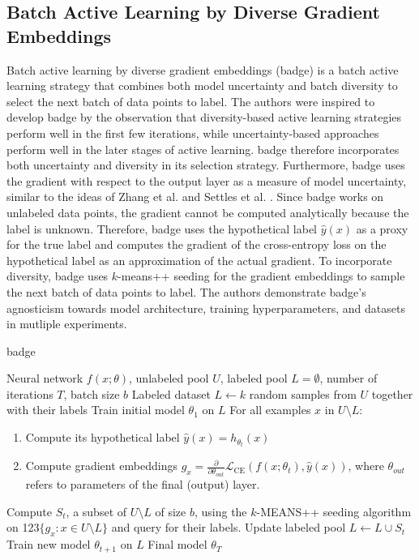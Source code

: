 \subsection{Batch Active Learning by Diverse Gradient Embeddings}
\label{sec:Related_work:Active_Learning:BADGE}
Batch active learning by diverse gradient embeddings (\gls{badge}) \cite{ash2019deep} is a batch active learning strategy that combines both model uncertainty
and batch diversity to select the next batch of data points to label. The authors were inspired to develop \gls{badge} by the observation that diversity-based
active learning strategies perform well in the first few iterations, while uncertainty-based approaches perform well in the later stages of active learning.
\gls{badge} therefore incorporates both uncertainty and diversity in its selection strategy. Furthermore, \gls{badge} uses the
gradient with respect to the output layer as a measure of model uncertainty, similar to the ideas of Zhang et al. \cite{zhang2017active} and Settles et al. \cite{settles2007multiple}.
Since \gls{badge} works on unlabeled data points, the gradient cannot be computed analytically because the label is unknown. Therefore, \gls{badge} uses the hypothetical
label $\hat{y}(x)$ as a proxy for the true label and computes the gradient of the cross-entropy loss on the hypothetical label as an approximation of the
actual gradient. To incorporate diversity, \gls{badge} uses $k$-means++ seeding \cite{arthur2007k} for the gradient embeddings to sample the next batch of data
points to label. The authors demonstrate \gls{badge}'s agnosticism towards model architecture, training hyperparameters, and datasets in mutliple experiments.
\begin{algorithm}
    \caption{\gls{badge}} \label{alg:Badge}
    \begin{algorithmic}[1]
        \Require Neural network $f(x;\theta)$, unlabeled pool $U$, labeled pool $L=\emptyset$, number of iterations $T$, batch size $b$
        \State Labeled dataset $L \leftarrow k$ random samples from $U$ together with their labels
        \State Train initial model $\theta_1$ on $L$
            \State For all examples $x$ in $U \setminus L$:
            \begin{enumerate}[leftmargin=0.8in]
                \item Compute its hypothetical label $\hat{y}(x) = h_{\theta_t}(x)$
                \item Compute gradient embeddings $g_x = \frac{\partial}{\partial \theta_{out}} \mathcal{L}_{\text{CE}}(f(x;\theta_t),\hat{y}(x))$, where
                $\theta_{out}$ refers to parameters of the final (output) layer.
            \end{enumerate}
            \State Compute $S_t$, a subset of $U \setminus L$ of size $b$, using the $k$-MEANS++ seeding algorithm on {\color{white} 123}$\{ g_x: x \in U
            \setminus L\}$ and query for their labels.
            \State Update labeled pool $L \leftarrow L \cup S_t$
            \State Train new model $\theta_{t+1}$ on $L$
        \EndFor
        \return Final model $\theta_T$
    \end{algorithmic}
\end{algorithm}

